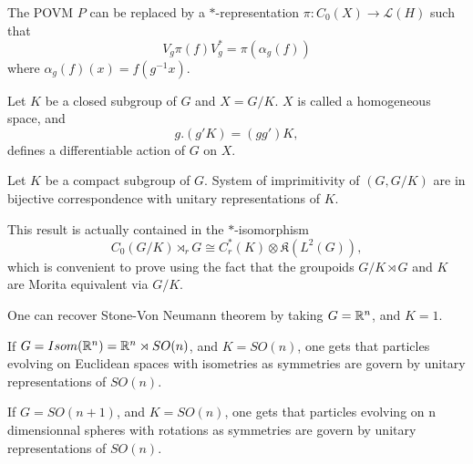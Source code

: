 \begin{rk} The POVM $P$ can be replaced by a $*$-representation $\pi : C_0(X)\rightarrow \mathcal L(H)$ such that 
\[V_g \pi(f) V_g^* = \pi(\alpha_g(f))\]
where $\alpha_g (f) (x) = f(g^{-1}x)$.
\end{rk}

Let $K$ be a closed subgroup of $G$ and $X=G/K$. $X$ is called a homogeneous space, and 
\[g.(g'K) = (gg')K,\] 
defines a differentiable action of $G$ on $X$.

\begin{thm}[Mackey]
Let $K$ be a compact subgroup of $G$. System of imprimitivity of $(G,G/K)$ are in bijective correspondence with unitary representations of $K$.
\end{thm}

\begin{rk}
This result is actually contained in the $*$-isomorphism 
\[C_0(G/K)\rtimes_r G \cong C^*_r (K) \otimes \mathfrak K(L^2(G)),\]
which is convenient to prove using the fact that the groupoids $G/K\rtimes G$ and $K$ are Morita equivalent via $G/K$.
\end{rk}

\begin{rk}
One can recover Stone-Von Neumann theorem by taking $G= \mathbb R^n$, and $K=1$.
\end{rk}

\begin{rk}
If $G= Isom(\mathbb R^n)= \mathbb R^n \rtimes SO(n)$, and $K=SO(n)$, one gets that particles evolving on Euclidean spaces with isometries as symmetries are govern by unitary representations of $SO(n)$.
\end{rk}

\begin{rk}
If $G= SO(n+1)$, and $K=SO(n)$, one gets that particles evolving on n dimensionnal spheres with rotations as symmetries are govern by unitary representations of $SO(n)$.
\end{rk}

